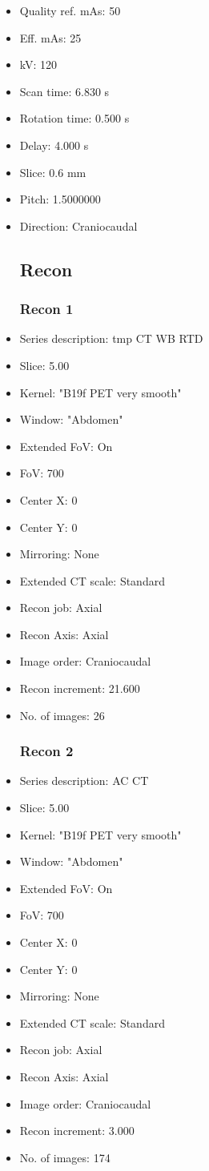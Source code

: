\documentclass[12pt]{article}
\begin{document}
\begin{itemize}
\subsection{Scan}
\item Quality ref. mAs: 50\item Eff. mAs: 25\item kV: 120\item Scan time: 6.830 s\item Rotation time: 0.500 s\item Delay: 4.000 s\item Slice: 0.6 mm\item Pitch: 1.5000000\item Direction: Craniocaudal
\subsection{Recon}

\subsubsection{Recon 1}
\item Series description: tmp CT WB RTD
\item Slice: 5.00
\item Kernel: "B19f PET very smooth"
\item Window: "Abdomen"
\item Extended FoV: On
\item FoV: 700
\item Center X: 0
\item Center Y: 0
\item Mirroring: None
\item Extended CT scale: Standard
\item Recon job: Axial
\item Recon Axis: Axial
\item Image order: Craniocaudal
\item Recon increment: 21.600
\item No. of images: 26
\subsubsection{Recon 2}
\item Series description: AC CT
\item Slice: 5.00
\item Kernel: "B19f PET very smooth"
\item Window: "Abdomen"
\item Extended FoV: On
\item FoV: 700
\item Center X: 0
\item Center Y: 0
\item Mirroring: None
\item Extended CT scale: Standard
\item Recon job: Axial
\item Recon Axis: Axial
\item Image order: Craniocaudal
\item Recon increment: 3.000
\item No. of images: 174

\end{itemize}
\end{document}
